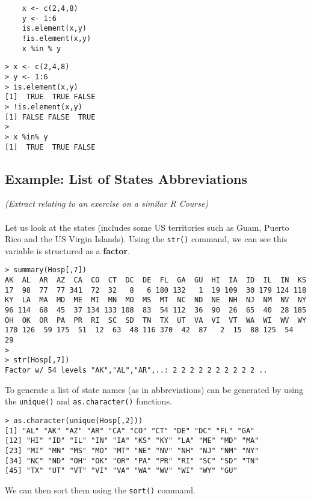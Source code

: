 \documentclass[]{article}
\begin{document}
\begin{framed}
	\begin{verbatim}
	x <- c(2,4,8)
	y <- 1:6
	is.element(x,y)
	!is.element(x,y)
	x %in % y
	\end{verbatim}
\end{framed}

\begin{verbatim}
> x <- c(2,4,8)
> y <- 1:6
> is.element(x,y)
[1]  TRUE  TRUE FALSE
> !is.element(x,y)
[1] FALSE FALSE  TRUE
> 
> x %in% y
[1]  TRUE  TRUE FALSE
\end{verbatim}

\subsection*{Example: List of States Abbreviations}
\textit{(Extract relating to an exercise on a similar R Course)\\\\}
\noindent Let us look at the states (includes some US territories such as Guam, Puerto Rico and the US Virgin Islands). Using the \texttt{str()} command, we can see this variable is structured as a \textbf{factor}.
\begin{verbatim}
> summary(Hosp[,7])
AK  AL  AR  AZ  CA  CO  CT  DC  DE  FL  GA  GU  HI  IA  ID  IL  IN  KS 
17  98  77  77 341  72  32   8   6 180 132   1  19 109  30 179 124 118 
KY  LA  MA  MD  ME  MI  MN  MO  MS  MT  NC  ND  NE  NH  NJ  NM  NV  NY 
96 114  68  45  37 134 133 108  83  54 112  36  90  26  65  40  28 185 
OH  OK  OR  PA  PR  RI  SC  SD  TN  TX  UT  VA  VI  VT  WA  WI  WV  WY 
170 126  59 175  51  12  63  48 116 370  42  87   2  15  88 125  54  29
>
> str(Hosp[,7])
Factor w/ 54 levels "AK","AL","AR",..: 2 2 2 2 2 2 2 2 2 2 ..
\end{verbatim}

To generate a list of state names (as in abbreviations) can be generated by using the \texttt{unique()} and \texttt{as.character()} functions.
\begin{verbatim}
> as.character(unique(Hosp[,2]))
[1] "AL" "AK" "AZ" "AR" "CA" "CO" "CT" "DE" "DC" "FL" "GA"
[12] "HI" "ID" "IL" "IN" "IA" "KS" "KY" "LA" "ME" "MD" "MA"
[23] "MI" "MN" "MS" "MO" "MT" "NE" "NV" "NH" "NJ" "NM" "NY"
[34] "NC" "ND" "OH" "OK" "OR" "PA" "PR" "RI" "SC" "SD" "TN"
[45] "TX" "UT" "VT" "VI" "VA" "WA" "WV" "WI" "WY" "GU"

\end{verbatim}

We can then sort them using the \texttt{sort()} command.
\end{document}
